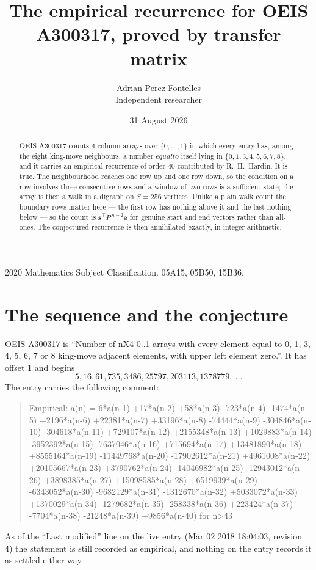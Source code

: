 \documentclass[11pt,a4paper]{article}
\title{The empirical recurrence for OEIS A300317, proved by transfer matrix}
\author{Adrian Perez Fontelles\\ \small Independent researcher}
\date{31 August 2026}
\theoremstyle{plain}
\theoremstyle{definition}
\begin{document}
\maketitle

\begin{abstract}
OEIS A300317 counts $4$-column arrays over $\{0,\dots,1\}$ in which every entry has,
among the eight king-move neighbours, a number $equal to$ itself lying in $\{0,1,3,4,5,6,7,8\}$, and it carries an empirical
recurrence of order $40$ contributed by R.~H.~Hardin. It is true. The neighbourhood
reaches one row up and one row down, so the condition on a row involves three consecutive
rows and a window of two rows is a sufficient state; the array is then a walk in a digraph
on $S=256$ vertices. Unlike a plain walk count the boundary rows matter here --- the first
row has nothing above it and the last nothing below --- so the count is
$\mathbf{s}^{\!\top}P^{\,n-2}\mathbf{e}$ for genuine start and end vectors rather than
all-ones. The conjectured recurrence is then annihilated exactly, in integer arithmetic.
\end{abstract}

\noindent\small 2020 Mathematics Subject Classification. 05A15, 05B50, 15B36.\normalsize

\section{The sequence and the conjecture}

OEIS A300317 is ``Number of nX4 0..1 arrays with every element equal to 0, 1, 3, 4, 5, 6, 7 or 8 king-move adjacent elements, with upper left element zero.''. It has offset
$1$ and begins
\[
5, 16, 61, 735, 3486, 25797, 203113, 1378779,\ \dots
\]
The entry carries the following comment:
\begin{quote}\small
Empirical: a(n) = 6*a(n-1) +17*a(n-2) +58*a(n-3) -723*a(n-4) -1474*a(n-5) +2196*a(n-6) +22381*a(n-7) +33196*a(n-8) -74444*a(n-9) -304846*a(n-10) -304618*a(n-11) +729107*a(n-12) +2155348*a(n-13) +1029883*a(n-14) -3952392*a(n-15) -7637046*a(n-16) +715694*a(n-17) +13481890*a(n-18) +8555164*a(n-19) -11449768*a(n-20) -17902612*a(n-21) +4961008*a(n-22) +20105667*a(n-23) +3790762*a(n-24) -14046982*a(n-25) -12943012*a(n-26) +3898385*a(n-27) +15098585*a(n-28) +6519939*a(n-29) -6343052*a(n-30) -9682129*a(n-31) -1312670*a(n-32) +5033072*a(n-33) +1370029*a(n-34) -1279682*a(n-35) -258338*a(n-36) +223424*a(n-37) -7704*a(n-38) -21248*a(n-39) +9856*a(n-40) for n>43
\end{quote}
As of the ``Last modified'' line on the live entry (Mar 02 2018 18:04:03, revision
4) the statement is still recorded as empirical, and nothing on the entry
records it as settled either way.
\end{document}
